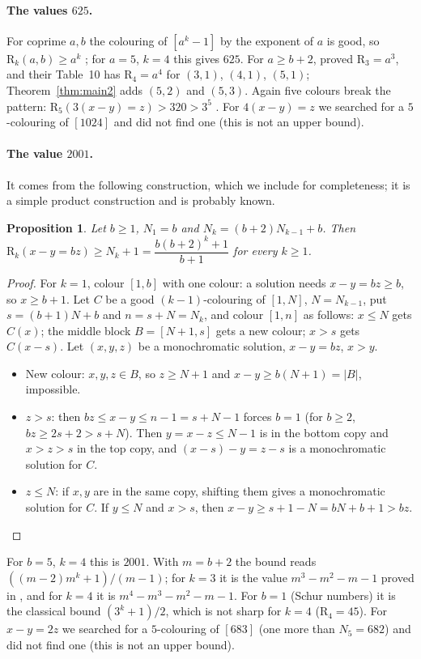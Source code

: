 \documentclass[11pt,a4paper]{article}
\newtheorem{proposition}[theorem]{Proposition}
\theoremstyle{definition}
\theoremstyle{remark}
\newcommand{\R}{\mathrm{R}}
\begin{document}
\paragraph{The values $625$.} For coprime $a,b$ the colouring of $[a^k-1]$ by the exponent of $a$ is good, so $\R_k(a,b)\ge a^k$ \cite[Lemma~4.1]{CDW22}; for $a=5$, $k=4$ this gives $625$. For $a\ge b+2$, \cite{CDW22} proved $\R_3=a^3$, and their Table~10 has $\R_4=a^4$ for $(3,1)$, $(4,1)$, $(5,1)$; Theorem~\ref{thm:main2} adds $(5,2)$ and $(5,3)$. Again five colours break the pattern: $\R_5(3(x-y)=z)>320>3^5$ \cite{Ich26b}. For $4(x-y)=z$ we searched for a $5$-colouring of $[1024]$ and did not find one (this is not an upper bound).

\paragraph{The value $2001$.} It comes from the following construction, which we include for completeness; it is a simple product construction and is probably known.
\begin{proposition}\label{prop:blocks}
Let $b\ge1$, $N_1=b$ and $N_k=(b+2)N_{k-1}+b$. Then $\R_k(x-y=bz)\ge N_k+1=\dfrac{b(b+2)^k+1}{b+1}$ for every $k\ge1$.
\end{proposition}
\begin{proof}
For $k=1$, colour $[1,b]$ with one colour: a solution needs $x-y=bz\ge b$, so $x\ge b+1$. Let $C$ be a good $(k-1)$-colouring of $[1,N]$, $N=N_{k-1}$, put $s=(b+1)N+b$ and $n=s+N=N_k$, and colour $[1,n]$ as follows: $x\le N$ gets $C(x)$; the middle block $B=[N+1,s]$ gets a new colour; $x>s$ gets $C(x-s)$. Let $(x,y,z)$ be a monochromatic solution, $x-y=bz$, $x>y$.
\begin{itemize}
\item New colour: $x,y,z\in B$, so $z\ge N+1$ and $x-y\ge b(N+1)=|B|$, impossible.
\item $z>s$: then $bz\le x-y\le n-1=s+N-1$ forces $b=1$ (for $b\ge2$, $bz\ge2s+2>s+N$). Then $y=x-z\le N-1$ is in the bottom copy and $x>z>s$ in the top copy, and $(x-s)-y=z-s$ is a monochromatic solution for $C$.
\item $z\le N$: if $x,y$ are in the same copy, shifting them gives a monochromatic solution for $C$. If $y\le N$ and $x>s$, then $x-y\ge s+1-N=bN+b+1>bz$. \qedhere
\end{itemize}
\end{proof}
For $b=5$, $k=4$ this is $2001$. With $m=b+2$ the bound reads $((m-2)m^k+1)/(m-1)$; for $k=3$ it is the value $m^3-m^2-m-1$ proved in \cite{CDW22}, and for $k=4$ it is $m^4-m^3-m^2-m-1$. For $b=1$ (Schur numbers) it is the classical bound $(3^k+1)/2$, which is not sharp for $k=4$ ($\R_4=45$). For $x-y=2z$ we searched for a $5$-colouring of $[683]$ (one more than $N_5=682$) and did not find one (this is not an upper bound).
\end{document}
